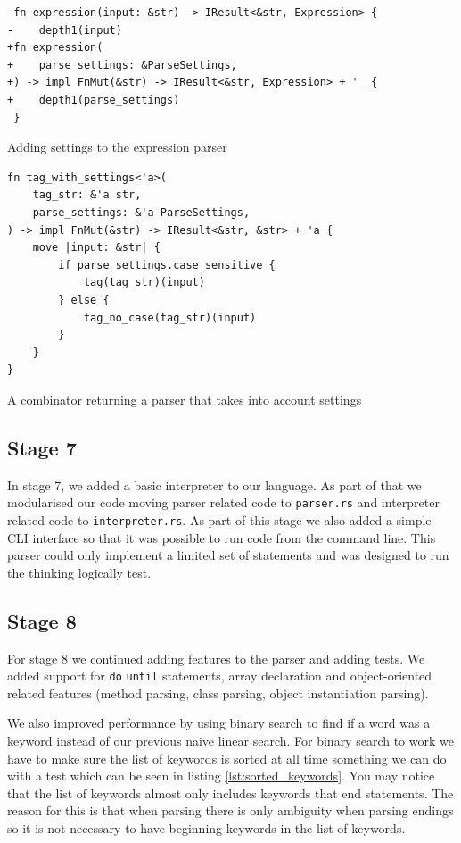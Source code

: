 \documentclass{article}
\begin{document}
\begin{listing}
	\begin{verbatim}
-fn expression(input: &str) -> IResult<&str, Expression> {
-    depth1(input)
+fn expression(
+    parse_settings: &ParseSettings,
+) -> impl FnMut(&str) -> IResult<&str, Expression> + '_ {
+    depth1(parse_settings)
 }
	\end{verbatim}
	\caption{Adding settings to the expression parser}
	\label{lst:settings_expression}
\end{listing}

\begin{listing}
	\begin{verbatim}
fn tag_with_settings<'a>(
    tag_str: &'a str,
    parse_settings: &'a ParseSettings,
) -> impl FnMut(&str) -> IResult<&str, &str> + 'a {
    move |input: &str| {
        if parse_settings.case_sensitive {
            tag(tag_str)(input)
        } else {
            tag_no_case(tag_str)(input)
        }
    }
}
	\end{verbatim}
	\caption{A combinator returning a parser that takes into account settings}
	\label{lst:tag_with_settings}
\end{listing}

\subsection{Stage 7}

In stage 7, we added a basic interpreter to our language. As part of that we
modularised our code moving parser related code to \texttt{parser.rs} and
interpreter related code to \texttt{interpreter.rs}. As part of this stage we
also added a simple CLI interface so that it was possible to run code from the
command line. This parser could only implement a limited set of statements and
was designed to run the thinking logically test.

\subsection{Stage 8}

For stage 8 we continued adding features to the parser and adding tests. We
added support for \texttt{do} \texttt{until} statements, array declaration and
object-oriented related features (method parsing, class parsing, object
instantiation parsing).

We also improved performance by using binary search to find if a word was a
keyword instead of our previous naive linear search. For binary search to work
we have to make sure the list of keywords is sorted at all time something we
can do with a test which can be seen in listing \ref{lst:sorted_keywords}. You
may notice that the list of keywords almost only includes keywords that end
statements. The reason for this is that when parsing there is only ambiguity
when parsing endings so it is not necessary to have beginning keywords in the
list of keywords.
\end{document}
